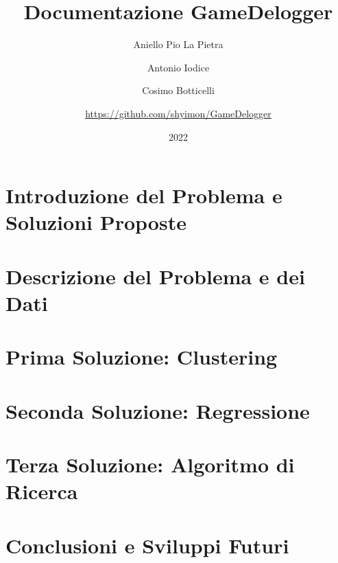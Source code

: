 \documentclass[12pt]{report}
\title{Documentazione GameDelogger}
\author{Aniello Pio La Pietra \and Antonio Iodice \and Cosimo Botticelli \and \url{https://github.com/shyimon/GameDelogger}}
\date{2022}
\begin{document}
\maketitle
\tableofcontents


\chapter{Introduzione del Problema e Soluzioni Proposte}


\chapter{Descrizione del Problema e dei Dati}


\chapter{Prima Soluzione: Clustering}


\chapter{Seconda Soluzione: Regressione}


\chapter{Terza Soluzione: Algoritmo di Ricerca}


\chapter{Conclusioni e Sviluppi Futuri}

\end{document}
